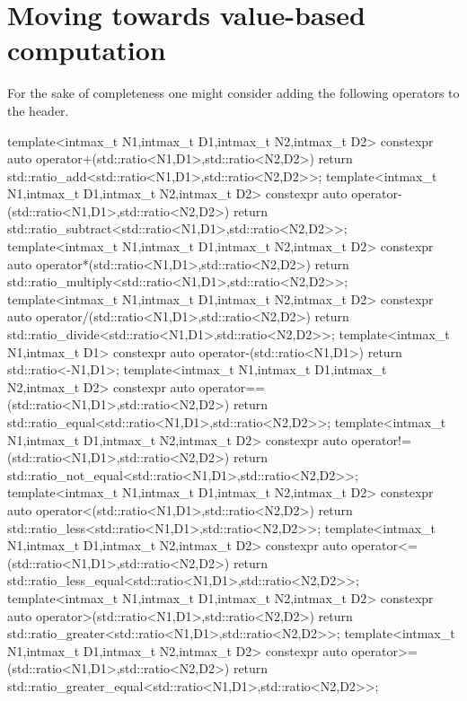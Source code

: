 \documentclass[ebook,11pt,article]{memoir}
\begin{document}
\section{Moving  towards value-based computation}
For the sake of completeness one might consider adding the following operators to the  header.
\begin{codeblock}
template<intmax_t N1,intmax_t D1,intmax_t N2,intmax_t D2>
constexpr auto operator+(std::ratio<N1,D1>,std::ratio<N2,D2>){
	return std::ratio_add<std::ratio<N1,D1>,std::ratio<N2,D2>>{};
}
template<intmax_t N1,intmax_t D1,intmax_t N2,intmax_t D2>
constexpr auto operator-(std::ratio<N1,D1>,std::ratio<N2,D2>){
	return std::ratio_subtract<std::ratio<N1,D1>,std::ratio<N2,D2>>{};
}
template<intmax_t N1,intmax_t D1,intmax_t N2,intmax_t D2>
constexpr auto operator*(std::ratio<N1,D1>,std::ratio<N2,D2>){
	return std::ratio_multiply<std::ratio<N1,D1>,std::ratio<N2,D2>>{};
}
template<intmax_t N1,intmax_t D1,intmax_t N2,intmax_t D2>
constexpr auto operator/(std::ratio<N1,D1>,std::ratio<N2,D2>){
	return std::ratio_divide<std::ratio<N1,D1>,std::ratio<N2,D2>>{};
}
template<intmax_t N1,intmax_t D1>
constexpr auto operator-(std::ratio<N1,D1>){
	return std::ratio<-N1,D1>{};
}
template<intmax_t N1,intmax_t D1,intmax_t N2,intmax_t D2>
constexpr auto operator==(std::ratio<N1,D1>,std::ratio<N2,D2>){
	return std::ratio_equal<std::ratio<N1,D1>,std::ratio<N2,D2>>{};
}
template<intmax_t N1,intmax_t D1,intmax_t N2,intmax_t D2>
constexpr auto operator!=(std::ratio<N1,D1>,std::ratio<N2,D2>){
	return std::ratio_not_equal<std::ratio<N1,D1>,std::ratio<N2,D2>>{};
}
template<intmax_t N1,intmax_t D1,intmax_t N2,intmax_t D2>
constexpr auto operator<(std::ratio<N1,D1>,std::ratio<N2,D2>){
	return std::ratio_less<std::ratio<N1,D1>,std::ratio<N2,D2>>{};
}
template<intmax_t N1,intmax_t D1,intmax_t N2,intmax_t D2>
constexpr auto operator<=(std::ratio<N1,D1>,std::ratio<N2,D2>){
	return std::ratio_less_equal<std::ratio<N1,D1>,std::ratio<N2,D2>>{};
}
template<intmax_t N1,intmax_t D1,intmax_t N2,intmax_t D2>
constexpr auto operator>(std::ratio<N1,D1>,std::ratio<N2,D2>){
	return std::ratio_greater<std::ratio<N1,D1>,std::ratio<N2,D2>>{};
}
template<intmax_t N1,intmax_t D1,intmax_t N2,intmax_t D2>
constexpr auto operator>=(std::ratio<N1,D1>,std::ratio<N2,D2>){
	return std::ratio_greater_equal<std::ratio<N1,D1>,std::ratio<N2,D2>>{};
} 
\end{codeblock}
\end{document}
